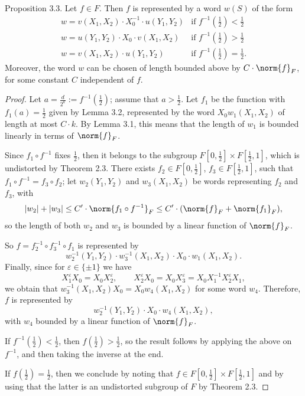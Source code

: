\begin{authorstatement}{Proposition 3.3.}
Let $f\in F$. Then $f$ is represented by a word $w(S)$ of the form
\[
\begin{array}{ll}
w=v(X_1,X_2)\cdot X_0^{-1}\cdot u(Y_1,Y_2)&\text{if }f^{-1}(\frac12)<\frac12\\
w=u(Y_1,Y_2)\cdot X_0\cdot v(X_1,X_2)&\text{if }f^{-1}(\frac12)>\frac12\\
w=v(X_1,X_2)\cdot u(Y_1,Y_2)&\text{if }f^{-1}(\frac12)=\frac12.
\end{array}
\]
Moreover, the word $w$ can be chosen of length bounded above by $C\cdot\norm{f}_F$, for some constant $C$ independent of $f$.
\end{authorstatement}
\begin{proof}
Let $a=\frac d{2^k}:=f^{-1}(\frac12)$; assume that $a>\frac12$. Let $f_1$ be the function with $f_1(a)=\frac12$ given by Lemma 3.2, represented by the word $X_0w_1(X_1,X_2)$ of length at most $C\cdot k$. By Lemma 3.1, this means that the length of $w_1$ is bounded linearly in terms of $\norm{f}_F$.

Since $f_1\circ f^{-1}$ fixes $\frac12$, then it belongs to the subgroup $F[0,\frac12]\times F[\frac12,1]$, which is undistorted by Theorem 2.3. There exists $f_2\in F[0,\frac12]$, $f_3\in F[\frac12,1]$, such that $f_1\circ f^{-1}=f_3\circ f_2$; let $w_2(Y_1,Y_2)$ and $w_3(X_1,X_2)$ be words representing $f_2$ and $f_3$, with
\[
|w_2|+|w_3|\le C'\cdot\norm{f_1\circ f^{-1}}_F\le C'\cdot(\norm{f}_F+\norm{f_1}_F),
\]
so the length of both $w_2$ and $w_3$ is bounded by a linear function of $\norm{f}_F$.

So $f=f_2^{-1}\circ f_3^{-1}\circ f_1$ is represented by
\[
w_2^{-1}(Y_1,Y_2)\cdot w_3^{-1}(X_1,X_2)\cdot X_0\cdot w_1(X_1,X_2).
\]
Finally, since for $\varepsilon\in\{\pm1\}$ we have
\[
X_1^\varepsilon X_0=X_0X_2^\varepsilon,\qquad X_2^\varepsilon X_0=X_0X_3^\varepsilon=X_0X_1^{-1}X_2^\varepsilon X_1,
\]
we obtain that $w_3^{-1}(X_1,X_2)X_0=X_0w_4(X_1,X_2)$ for some word $w_4$. Therefore, $f$ is represented by
\[
w_2^{-1}(Y_1,Y_2)\cdot X_0\cdot w_4(X_1,X_2),
\]
with $w_4$ bounded by a linear function of $\norm{f}_F$.

If $f^{-1}(\frac12)<\frac12$, then $f(\frac12)>\frac12$, so the result follows by applying the above on $f^{-1}$, and then taking the inverse at the end.

If $f(\frac12)=\frac12$, then we conclude by noting that $f\in F[0,\frac12]\times F[\frac12,1]$ and by using that the latter is an undistorted subgroup of $F$ by Theorem 2.3.
\end{proof}
